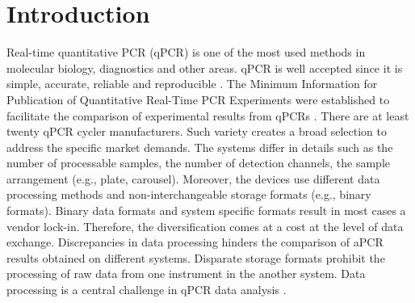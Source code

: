 \documentclass{bioinfo}
\begin{document}
\section{Introduction}
  Real-time quantitative PCR (qPCR) is one of the most used methods in molecular 
biology, diagnostics and other areas. qPCR is well accepted since 
it is simple, accurate, reliable and reproducible \cite{pabinger_2014}. The 
Minimum Information for Publication of Quantitative Real-Time PCR Experiments
were established to facilitate the comparison of experimental results from qPCRs 
\cite{huggett_2013}. There are at least twenty qPCR cycler manufacturers. Such variety creates a broad selection to 
address the specific market demands. The systems differ in details such as the 
number of processable samples, the number of detection channels, the sample 
arrangement (e.g., plate, carousel). Moreover, the devices use different 
data processing methods and non-interchangeable storage formats (e.g.,  binary formats). 
Binary data formats and system specific formats result in most cases a vendor 
lock-in. Therefore, the diversification comes at a cost at the level of data 
exchange. Discrepancies in data processing hinders the comparison of aPCR results 
obtained on different systems. Disparate storage formats prohibit the processing 
of raw data from one instrument in the another system. Data processing is a 
central challenge in qPCR data analysis \cite{bustin_reproducibility_2014, roediger2015r, 
spiess_impact_2014, spiess_system-specific_2016}.
\end{document}
